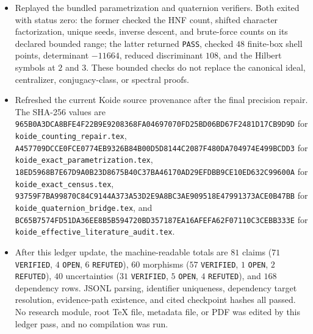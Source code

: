 \begin{itemize}
\texttt{supporting\_materials/workbench/evidence/koide\_exact\_checkpoint\_20260904/}.
It contains \(18\) files.  The self-excluding \(17\)-entry manifest has SHA-256
\texttt{8D108EB928E5D07093BADDE169F443A4A38B6FCF3EB59D5192BDD33ECEF8D7A4}
and verifies with zero mismatches; its README has SHA-256
\texttt{FFF150860F000CF17DCD0CD3928D939BFA5B501D59C715DE444A3A8D8CDF899A}.
The final census result JSON, compressed full coordinate stream, and
coordinate-audit receipt have SHA-256, respectively,
\texttt{DA92F0866074E530B8174A48915CAA0F65CD4CD8957E209306ADC200739D1961},
\texttt{DFC313492AEDB396DCFA10520BFEFC699BA601357BC9933D921DFA3884310BD4},
and
\texttt{3010363108E7B460B7331A92F3263BBD77992AEDFC3064973750E16D707DA80F}.
\item Replayed the bundled parametrization and quaternion verifiers.  Both
exited with status zero: the former checked the HNF count, shifted character
factorization, unique seeds, inverse descent, and brute-force counts on its
declared bounded range; the latter returned \texttt{PASS}, checked \(48\)
finite-box shell points, determinant \(-11664\), reduced discriminant \(108\),
and the Hilbert symbols at \(2\) and \(3\).  These bounded checks do not
replace the canonical ideal, centralizer, conjugacy-class, or spectral proofs.
\item Refreshed the current Koide source provenance after the final precision
repair.  The SHA-256 values are
\texttt{965B0A3DCA8BFE4F22B9E9208368FA04697070FD25BD06BD67F2481D17CB9D9D}
for \texttt{koide\_counting\_repair.tex},
\texttt{A457709DCCE0FCE0774EB9326B84B00D5D8144C2087F480DA704974E499BCDD3}
for \texttt{koide\_exact\_parametrization.tex},
\texttt{18ED5968B7E67D9A0B23D8675B40C37BA46170AD29EFDBB9CE10ED632C99600A}
for \texttt{koide\_exact\_census.tex},
\texttt{93759F7BA99870C84C9144A373A53D2E9A8BC3AE909518E47991373ACE0B47BB}
for \texttt{koide\_quaternion\_bridge.tex}, and
\texttt{BC65B7574FD51DA36EE8B5B594720BD357187EA16AFEFA62F07110C3CEBB333E}
for \texttt{koide\_effective\_literature\_audit.tex}.
\item After this ledger update, the machine-readable totals are \(81\)
claims (\(71\) \texttt{VERIFIED}, \(4\) \texttt{OPEN}, \(6\)
\texttt{REFUTED}), \(60\) morphisms (\(57\) \texttt{VERIFIED}, \(1\)
\texttt{OPEN}, \(2\) \texttt{REFUTED}), \(40\) uncertainties (\(31\)
\texttt{VERIFIED}, \(5\) \texttt{OPEN}, \(4\) \texttt{REFUTED}), and
\(168\) dependency rows.  JSONL parsing, identifier uniqueness, dependency
target resolution, evidence-path existence, and cited checkpoint hashes all
passed.  No research module, root TeX file, metadata file, or PDF was edited
by this ledger pass, and no compilation was run.
\end{itemize}

